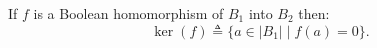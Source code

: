 If $f$ is a Boolean homomorphism of $B_1$ into $B_2$ then:
$$\ker(f) \triangleq \{a \in |B_1| \mid f(a) = 0\}.$$
